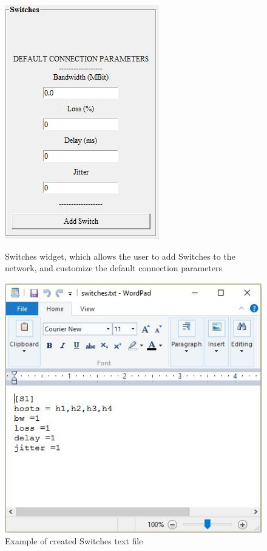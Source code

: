 \begin{figure}[H]
\centering
\begin{minipage}{.5\textwidth}
  \centering
  \includegraphics[width=.5\linewidth]{Switches}
  \caption{Switches widget, which allows the user to add Switches to the network, and customize the default connection parameters}
  \label{fig:test1}
\end{minipage}%
\begin{minipage}{.5\textwidth}
  \centering
  \includegraphics[width=.8\linewidth]{switches_txt}
  \caption{Example of created Switches text file}
  \label{fig:test2}
\end{minipage}
\end{figure}

